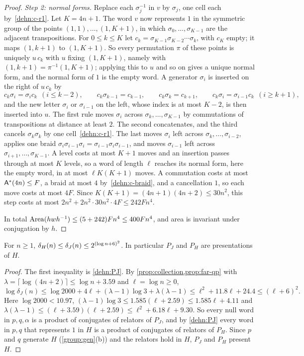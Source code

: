 \begin{proof}
\emph{Step 2: normal forms.} Replace each $\sigma_j^{-1}$ in $v$ by $\sigma_j$, one cell each by~\ref{dehn:c-r1}. Let $K=4n+1$. The word $v$
now represents $1$ in the symmetric group of the points $(1,1),\dots,(1,K+1)$, in which $\sigma_0,\dots,\sigma_{K-1}$ are the adjacent
transpositions. For $0\le k\le K$ let $c_k=\sigma_{K-1}\sigma_{K-2}\cdots\sigma_k$, with $c_K$ empty; it maps $(1,k+1)$ to $(1,K+1)$. So every
permutation $\pi$ of these points is uniquely $u\,c_k$ with $u$ fixing $(1,K+1)$, namely with $(1,k+1)=\pi^{-1}(1,K+1)$; applying this to
$u$ and so on gives a unique normal form, and the normal form of $1$ is the empty word. A generator $\sigma_i$ is inserted on the right of
$u\,c_k$ by
\[
c_k\sigma_i=\sigma_ic_k\ \ (i\le k-2),\qquad c_k\sigma_{k-1}=c_{k-1},\qquad c_k\sigma_k=c_{k+1},\qquad c_k\sigma_i=\sigma_{i-1}c_k\ \ (i\ge k+1),
\]
and the new letter $\sigma_i$ or $\sigma_{i-1}$ on the left, whose index is at most $K-2$, is then inserted into $u$. The first rule moves
$\sigma_i$ across $\sigma_k,\dots,\sigma_{K-1}$ by commutations of transpositions at distance at least $2$. The second concatenates, and the
third cancels $\sigma_k\sigma_k$ by one cell~\ref{dehn:c-r1}. The last moves $\sigma_i$ left across $\sigma_k,\dots,\sigma_{i-2}$, applies one
braid $\sigma_i\sigma_{i-1}\sigma_i=\sigma_{i-1}\sigma_i\sigma_{i-1}$, and moves $\sigma_{i-1}$ left across $\sigma_{i+1},\dots,\sigma_{K-1}$. A level
costs at most $K+1$ moves and an insertion passes through at most $K$ levels, so a word of length $\ell$ reaches its normal form, here the
empty word, in at most $\ell K(K+1)$ moves. A commutation costs at most $\mathsf A^*(4n)\le F$, a braid at most $4$ by~\ref{dehn:c-braid}, and a
cancellation $1$, so each move costs at most $4F$. Since $K(K+1)=(4n+1)(4n+2)\le30n^2$, this step costs at most
$2n^2+2n^2\cdot30n^2\cdot4F\le242Fn^4$.

In total $\operatorname{Area}(hwh^{-1})\le(5+242)Fn^4\le400Fn^4$, and area is invariant under conjugation by $h$.
\end{proof}

\begin{corollary}\label{cor:dehn-qp}
For $n\ge1$, $\delta_{H}(n)\le\delta_J(n)\le2^{(\log n+6)^2}$. In particular $P_J$ and $P_H$ are presentations of $H$.
\end{corollary}

\begin{proof}
The first inequality is \cref{dehn:PJ}. By \cref{prop:collection,prop:far-qp} with $\lambda=\lceil\log(4n+2)\rceil\le\log n+3.59$ and
$\ell=\log n\ge0$,
\[
\log\delta_J(n)\le\log2000+4\ell+(\lambda-1)\log3+\lambda(\lambda-1)\le\ell^2+11.8\ell+24.4\le(\ell+6)^2 .
\]
Here $\log2000<10.97$, $(\lambda-1)\log3\le1.585(\ell+2.59)\le1.585\ell+4.11$ and $\lambda(\lambda-1)\le(\ell+3.59)(\ell+2.59)\le\ell^2+6.18\ell+9.30$.
So every null word in $p,q,\alpha$ is a product of conjugates of relators of $P_J$, and by \cref{dehn:PJ} every word in $p,q$ that represents
$1$ in $H$ is a product of conjugates of relators of $P_H$. Since $p$ and $q$ generate $H$ (\cref{group:gen}(b)) and the relators hold in $H$,
$P_J$ and $P_H$ present $H$.
\end{proof}


